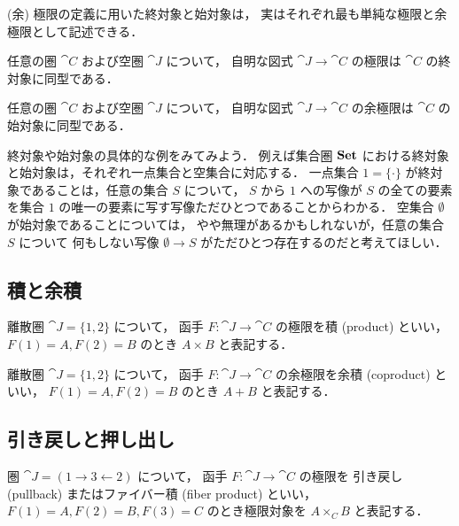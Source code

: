\documentclass[titlepage]{ltjsreport}
\begin{document}
(余) 極限の定義に用いた終対象と始対象は，
実はそれぞれ最も単純な極限と余極限として記述できる．
\begin{theorem}[極限としての終対象]
  任意の圏 $\cat{C}$ および空圏 $\cat{J}$ について，
  自明な図式 $\cat{J}\to\cat{C}$ の極限は
  $\cat{C}$ の終対象に同型である．
\end{theorem}
\begin{theorem}[余極限としての始対象]
  任意の圏 $\cat{C}$ および空圏 $\cat{J}$ について，
  自明な図式 $\cat{J}\to\cat{C}$ の余極限は
  $\cat{C}$ の始対象に同型である．
\end{theorem}
終対象や始対象の具体的な例をみてみよう．
例えば集合圏 $\mathbf{Set}$ における終対象と始対象は，それぞれ一点集合と空集合に対応する．
一点集合 $1=\{\cdot\}$ が終対象であることは，任意の集合 $S$ について，
$S$ から $1$ への写像が $S$ の全ての要素を集合 $1$ の唯一の要素に写す写像ただひとつであることからわかる．
空集合 $\emptyset$ が始対象であることについては，
やや無理があるかもしれないが，任意の集合 $S$ について
何もしない写像 $\emptyset\to S$ がただひとつ存在するのだと考えてほしい．

\subsection{積と余積}

\begin{definition}[積]
  離散圏 $\cat{J}=\{1,2\}$ について，
  函手 $F:\cat{J}\to\cat{C}$ の極限を積 (product) といい，
  $F(1)=A,F(2)=B$ のとき $A\times B$ と表記する．
  \begin{center}
    
  \end{center}
\end{definition}

\begin{definition}[余積]
  離散圏 $\cat{J}=\{1,2\}$ について，
  函手 $F:\cat{J}\to\cat{C}$ の余極限を余積 (coproduct) といい，
  $F(1)=A,F(2)=B$ のとき $A+B$ と表記する．
  \begin{center}
    
  \end{center}
\end{definition}

\subsection{引き戻しと押し出し}

\begin{definition}[引き戻し]
  圏 $\cat{J}=(1\rightarrow3\leftarrow2)$ について，
  函手 $F:\cat{J}\to\cat{C}$ の極限を
  引き戻し (pullback) またはファイバー積 (fiber product) といい，
  $F(1)=A,F(2)=B,F(3)=C$ のとき極限対象を $A{\times}_{C}B$ と表記する．
\end{definition}
\end{document}
